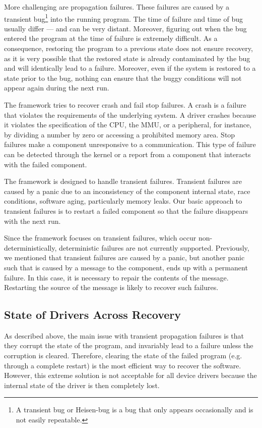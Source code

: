 \documentclass{report}
\begin{document}
More challenging are propagation failures. These failures are caused by a transient bug\footnote{A transient bug or Heisen-bug is a bug that only appears occasionally and is not easily repeatable\cite{Gray1985}.} into the running program. The time of failure and time of bug usually differ --- and can be very distant. Moreover, figuring out when the bug entered the program at the time of failure is extremely difficult. As a consequence, restoring the program to a previous state does not ensure recovery, as it is very possible that the restored state is already contaminated by the bug and will identically lead to a failure. Moreover, even if the system is restored to a state prior to the bug, nothing can ensure that the buggy conditions will not appear again during the next run.

The framework tries to recover crash and fail stop failures.  A crash is a failure that violates the requirements of the underlying system.  A driver crashes because it violates the specification of the CPU, the MMU, or a peripheral, for instance, by dividing a number by zero or accessing a prohibited memory area.  Stop failures make a component unresponsive to a communication.  This type of failure can be detected through the kernel or a report from a component that interacts with the failed component.

The framework is designed to handle transient failures.  Transient failures are caused by a panic due to an inconsistency of the component internal state, race conditions, software aging, particularly memory leaks.  Our basic approach to transient failures is to restart a failed component so that the failure disappears with the next run.

Since the framework focuses on transient failures, which occur non-deterministically, deterministic failures are not currently supported.  Previously, we mentioned that transient failures are caused by a panic, but another panic such that is caused by a message to the component, ends up with a permanent failure.  In this case, it is necessary to repair the contents of the message.  Restarting the source of the message is likely to recover such failures.



\subsection{State of Drivers Across Recovery}
\label{s:fw}

As described above, the main issue with transient propagation failures is that they corrupt the state of the program, and invariably lead to a failure unless the corruption is cleared. Therefore, clearing the state of the failed program (e.g. through a complete restart) is the most efficient way to recover the software.  However, this extreme solution is not acceptable for all device drivers because the internal state of the driver is then completely lost.
\end{document}
